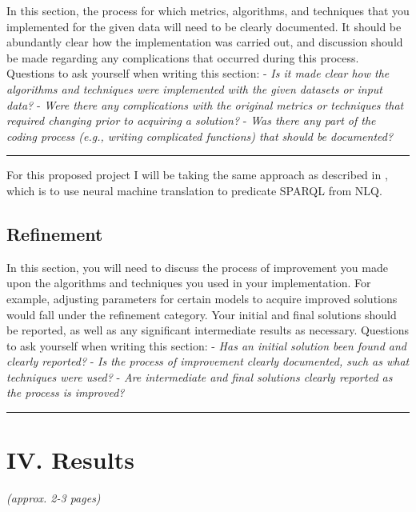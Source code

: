 \documentclass[12pt]{article}
\begin{document}
In this section, the process for which metrics, algorithms, and
techniques that you implemented for the given data will need to be
clearly documented. It should be abundantly clear how the implementation
was carried out, and discussion should be made regarding any
complications that occurred during this process. Questions to ask
yourself when writing this section: - \emph{Is it made clear how the
algorithms and techniques were implemented with the given datasets or
input data?} - \emph{Were there any complications with the original
metrics or techniques that required changing prior to acquiring a
solution?} - \emph{Was there any part of the coding process (e.g.,
writing complicated functions) that should be documented?}

\begin{center}\rule{0.5\linewidth}{\linethickness}\end{center}

For this proposed project I will be taking the same approach as
described in \cite{soru2018neural}, which is to use neural machine
translation to predicate SPARQL from NLQ.

\subsection{Refinement}\label{refinement}

In this section, you will need to discuss the process of improvement you
made upon the algorithms and techniques you used in your implementation.
For example, adjusting parameters for certain models to acquire improved
solutions would fall under the refinement category. Your initial and
final solutions should be reported, as well as any significant
intermediate results as necessary. Questions to ask yourself when
writing this section: - \emph{Has an initial solution been found and
clearly reported?} - \emph{Is the process of improvement clearly
documented, such as what techniques were used?} - \emph{Are intermediate
and final solutions clearly reported as the process is improved?}

\begin{center}\rule{0.5\linewidth}{\linethickness}\end{center}

\section{IV. Results}\label{iv.-results}

\emph{(approx. 2-3 pages)}
\end{document}
